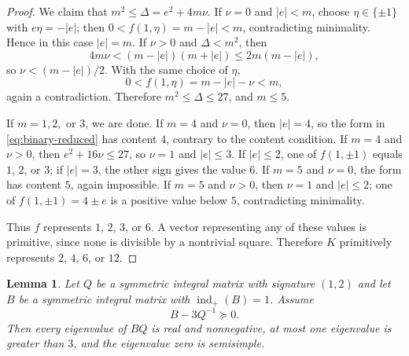 \documentclass[12pt]{amsart}
\numberwithin{equation}{section}
\newtheorem{lemma}[theorem]{Lemma}
\theoremstyle{definition}
\theoremstyle{remark}
\newcommand{\indp}{\operatorname{ind}_{+}}
\begin{document}
\begin{proof}
We claim that $m^2\leq\Delta=e^2+4m\nu$.  If $\nu=0$ and $|e|<m$,
choose $\eta\in\{\pm1\}$ with $e\eta=-|e|$; then
$0<f(1,\eta)=m-|e|<m$, contradicting minimality.  Hence in this case
$|e|=m$.  If $\nu>0$ and $\Delta<m^2$, then
\[
 4m\nu<(m-|e|)(m+|e|)\leq2m(m-|e|),
\]
so $\nu<(m-|e|)/2$.  With the same choice of $\eta$,
\[
                    0<f(1,\eta)=m-|e|-\nu<m,
\]
again a contradiction.  Therefore $m^2\leq\Delta\leq27$, and $m\leq5$.

If $m=1,2,$ or $3$, we are done.  If $m=4$ and $\nu=0$, then
$|e|=4$, so the form in \eqref{eq:binary-reduced} has content $4$,
contrary to the content condition.  If $m=4$ and $\nu>0$, then
$e^2+16\nu\leq27$, so $\nu=1$ and $|e|\leq3$.  If $|e|\leq2$, one
of $f(1,\pm1)$ equals $1$, $2$, or $3$; if $|e|=3$, the other sign
gives the value $6$.  If $m=5$ and $\nu=0$, the form has content $5$,
again impossible.  If $m=5$ and $\nu>0$, then $\nu=1$ and
$|e|\leq2$; one of $f(1,\pm1)=4\pm e$ is a positive value below $5$,
contradicting minimality.

Thus $f$ represents $1$, $2$, $3$, or $6$.  A vector representing any
of these values is primitive, since none is divisible by a nontrivial
square.  Therefore $K$ primitively represents $2$, $4$, $6$, or $12$.
\end{proof}

\begin{lemma}\label{lem:spectral}
Let $Q$ be a symmetric integral matrix with signature $(1,2)$ and let $B$ be a symmetric integral matrix with
$\indp(B)=1$.  Assume
\[
                              B-3Q^{-1}\succeq0.
\]
Then every eigenvalue of $BQ$ is real and nonnegative, at most one
eigenvalue is greater than $3$, and the eigenvalue zero is semisimple.
\end{lemma}
\end{document}
